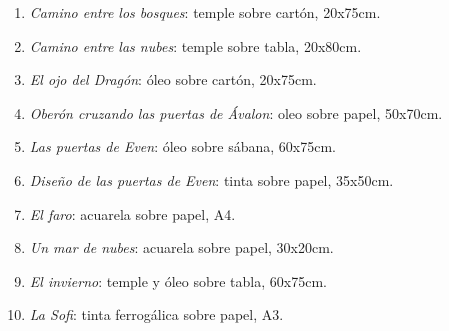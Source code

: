 \documentclass[twoside]{article}
\begin{document}
  \begin{enumerate}
    \item \textit{Camino entre los bosques}: temple sobre cartón, 20x75cm.
    \item \textit{Camino entre las nubes}: temple sobre tabla, 20x80cm.
    \item \textit{El ojo del Dragón}: óleo sobre cartón, 20x75cm.
    \item \textit{Oberón cruzando las puertas de Ávalon}: oleo sobre papel, 50x70cm.
    \item \textit{Las puertas de Even}: óleo sobre sábana, 60x75cm.
    \item \textit{Diseño de las puertas de Even}: tinta sobre papel, 35x50cm.
    \item \textit{El faro}: acuarela sobre papel, A4.
    \item \textit{Un mar de nubes}: acuarela sobre papel, 30x20cm.
    \item \textit{El invierno}: temple y óleo sobre tabla, 60x75cm.
    \item \textit{La Sofi}: tinta ferrogálica sobre papel, A3.
    
  \end{enumerate}
\end{document}
